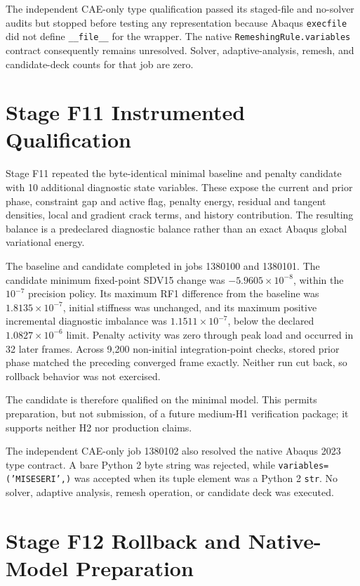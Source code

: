 The independent CAE-only type qualification passed its staged-file and
no-solver audits but stopped before testing any representation because
Abaqus \texttt{execfile} did not define \texttt{\_\_file\_\_} for the
wrapper. The native \texttt{RemeshingRule.variables} contract consequently
remains unresolved. Solver, adaptive-analysis, remesh, and candidate-deck
counts for that job are zero.

\section{Stage F11 Instrumented Qualification}

Stage F11 repeated the byte-identical minimal baseline and penalty candidate
with 10 additional diagnostic state variables. These expose the current and
prior phase, constraint gap and active flag, penalty energy, residual and
tangent densities, local and gradient crack terms, and history contribution.
The resulting balance is a predeclared diagnostic balance rather than an
exact Abaqus global variational energy.

The baseline and candidate completed in jobs 1380100 and 1380101. The
candidate minimum fixed-point SDV15 change was
$-5.9605\times10^{-8}$, within the $10^{-7}$ precision policy. Its maximum
RF1 difference from the baseline was $1.8135\times10^{-7}$, initial
stiffness was unchanged, and its maximum positive incremental diagnostic
imbalance was $1.1511\times10^{-7}$, below the declared
$1.0827\times10^{-6}$ limit. Penalty activity was zero through peak load and
occurred in 32 later frames. Across 9,200 non-initial integration-point
checks, stored prior phase matched the preceding converged frame exactly.
Neither run cut back, so rollback behavior was not exercised.

The candidate is therefore qualified on the minimal model. This permits
preparation, but not submission, of a future medium-H1 verification package;
it supports neither H2 nor production claims.

The independent CAE-only job 1380102 also resolved the native Abaqus 2023
type contract. A bare Python 2 byte string was rejected, while
\texttt{variables=('MISESERI',)} was accepted when its tuple element was a
Python 2 \texttt{str}. No solver, adaptive analysis, remesh operation, or
candidate deck was executed.

\section{Stage F12 Rollback and Native-Model Preparation}

